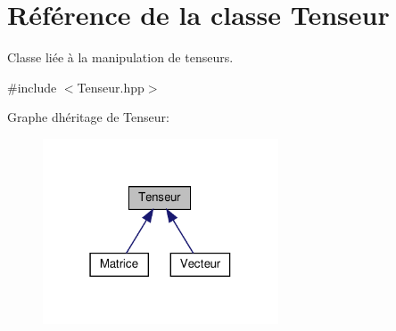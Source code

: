 \hypertarget{classTenseur}{}\section{Référence de la classe Tenseur}
\label{classTenseur}


Classe liée à la manipulation de tenseurs.  




{\ttfamily \#include $<$Tenseur.\+hpp$>$}



Graphe d\textquotesingle{}héritage de Tenseur\+:
\nopagebreak
\begin{figure}[H]
\begin{center}
\leavevmode
\includegraphics[width=198pt]{classTenseur__inherit__graph}
\end{center}
\end{figure}
